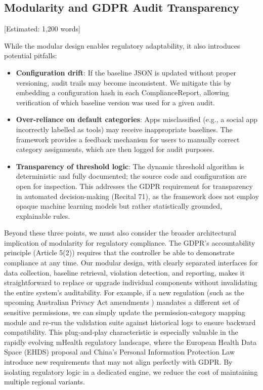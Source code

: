 \subsection{Modularity and GDPR Audit Transparency} [Estimated: 1,200 words]

While the modular design enables regulatory adaptability, it also introduces potential pitfalls:
\begin{itemize}
\item \textbf{Configuration drift}: If the baseline JSON is updated without proper versioning, audit trails may become inconsistent. We mitigate this by embedding a configuration hash in each ComplianceReport, allowing verification of which baseline version was used for a given audit.
\item \textbf{Over-reliance on default categories}: Apps misclassified (e.g., a social app incorrectly labelled as tools) may receive inappropriate baselines. The framework provides a feedback mechanism for users to manually correct category assignments, which are then logged for audit purposes.
\item \textbf{Transparency of threshold logic}: The dynamic threshold algorithm is deterministic and fully documented; the source code and configuration are open for inspection. This addresses the GDPR requirement for transparency in automated decision-making (Recital 71), as the framework does not employ opaque machine learning models but rather statistically grounded, explainable rules.
\end{itemize}

Beyond these three points, we must also consider the broader architectural implication of modularity for regulatory compliance. The GDPR's accountability principle (Article 5(2)) requires that the controller be able to demonstrate compliance at any time. Our modular design, with clearly separated interfaces for data collection, baseline retrieval, violation detection, and reporting, makes it straightforward to replace or upgrade individual components without invalidating the entire system's auditability. For example, if a new regulation (such as the upcoming Australian Privacy Act amendments \cite{2}) mandates a different set of sensitive permissions, we can simply update the permission‑category mapping module and re‑run the validation suite against historical logs to ensure backward compatibility. This plug‑and‑play characteristic is especially valuable in the rapidly evolving mHealth regulatory landscape, where the European Health Data Space (EHDS) proposal \cite{19} and China's Personal Information Protection Law \cite{20} introduce new requirements that may not align perfectly with GDPR. By isolating regulatory logic in a dedicated engine, we reduce the cost of maintaining multiple regional variants.

